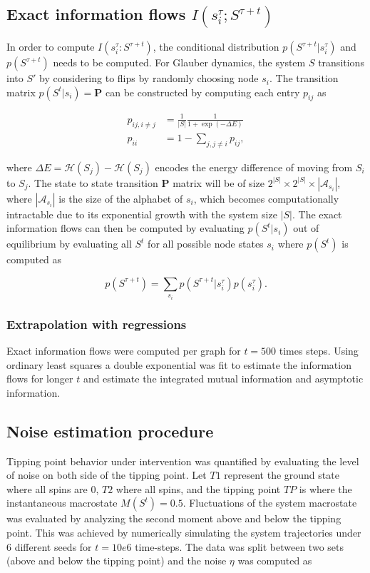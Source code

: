\documentclass[a4paper, 11pt, twocolumn]{article}
\begin{document}
\subsection{Exact information flows \(I(s_i^{\tau} ; S^{\tau + t})\)}
\label{sec:org59af222}
In  order  to  compute  \(I(s_i^{\tau}  :  S^{\tau + t})\),  the
conditional  distribution \(p(S^{\tau  +  t}  | s_i^{\tau})\)  and
\(p(S^{\tau + t})\) needs to  be computed. For Glauber dynamics,
the system  \(S\) transitions into \(S'\)  by considering to
flips  by randomly  choosing  node  \(s_i\). The  transition
matrix \(p(S^t |  s_i) = \textbf{P}\) can  be constructed by
computing each entry \(p_{ij}\) as

\[\label{eq:glauber}
\begin{split}
p_{ij, i \neq j} &= \frac{1}{|S|} \frac{1}{ 1 + \exp (-\Delta E) }\\
p_{ii} &= 1 - \sum_{j, j \neq i} p_{ij},
\end{split}\]

where \(\Delta E =  \mathcal{H}(S_j) - \mathcal{H}(S_j)\) encodes
the energy difference of moving from \(S_i\) to \(S_j\). The
state to  state transition \(\textbf{P}\) matrix  will be of
size  \(2^{|S|}  \times  2^{|S|} \times  |\mathcal{A}_{s_i}|\),  where
\(|\mathcal{A}_{s_i}|\)  is  the  size of  the  alphabet  of
\(s_i\),  which becomes  computationally intractable  due to
its  exponential growth  with the  system size  \(|S|\). The
exact information  flows can then be  computed by evaluating
\(p(S^t  |  s_i)\)  out  of equilibrium  by  evaluating  all
\(S^t\)  for   all  possible   node  states   \(s_i\)  where
\(p(S^t)\) is computed as

\[p(S^{\tau + t}) = \sum_{s_i} p(S^{\tau + t} | s_i^{\tau} ) p(s_i^{\tau}).\]

\subsubsection{Extrapolation with regressions}
\label{sec:org24d8ed1}
Exact information  flows were  computed per  graph for  \(t =
500\)  times steps.  Using  ordinary least  squares a  double
exponential was  fit to  estimate the information  flows for
longer \(t\)  and estimate  the integrated  mutual information
and asymptotic information.


\subsection{Noise estimation procedure}
\label{sec:orgc093508}
Tipping point behavior under intervention was quantified by evaluating
the level of noise on both side of the tipping point. Let \(T1\)
represent the ground state where all spins are 0, \(T2\) where all
spins, and the tipping point \(TP\) is where the instantaneous
macrostate \(M(S^t) = 0.5\). Fluctuations of the system macrostate was
evaluated by analyzing the second moment above and below the tipping
point. This was achieved by numerically simulating the system
trajectories under 6 different seeds for \(t = 10e6\) time-steps. The
data was split between two sets (above and below the tipping point) and
the noise \(\eta\) was computed as
\end{document}
